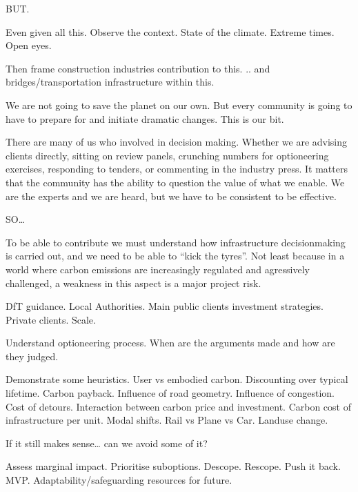 \documentclass[letterpaper,10pt,english]{jupyterBook}
\begin{document}
\sphinxAtStartPar
BUT.

\sphinxAtStartPar
Even given all this. Observe the context.
State of the climate. Extreme times. Open eyes.

\sphinxAtStartPar
Then frame construction industries contribution to this.
.. and bridges/transportation infrastructure within this.

\sphinxAtStartPar
We are not going to save the planet on our own. But every community is going to have to prepare for and initiate dramatic changes. This is our bit.

\sphinxAtStartPar
There are many of us who  involved in decision making. Whether we are advising clients directly, sitting on review panels, crunching numbers for optioneering exercises, responding to tenders, or commenting in the industry press. It matters that the community has the ability to question the value of what we enable. We are the experts and we are heard, but we have to be consistent to be effective.

\sphinxAtStartPar
SO…

\sphinxAtStartPar
To be able to contribute we must understand how infrastructure decision\sphinxhyphen{}making is carried out, and we need to be able to “kick the tyres”. Not least because in a world where carbon emissions are increasingly regulated and agressively challenged, a weakness in this aspect is a major project risk.

\sphinxAtStartPar
DfT guidance. Local Authorities. Main public clients \sphinxhyphen{} investment strategies. Private clients. Scale.

\sphinxAtStartPar
Understand optioneering process. When are the arguments made and how are they judged.

\sphinxAtStartPar
Demonstrate some heuristics.
User vs embodied carbon. Discounting over typical life\sphinxhyphen{}time. Carbon pay\sphinxhyphen{}back.
Influence of road geometry.
Influence of congestion.
Cost of detours.
Interaction between carbon price and investment.
Carbon cost of infrastructure per unit.
Modal shifts. Rail vs Plane vs Car.
Land\sphinxhyphen{}use change.

\sphinxAtStartPar
If it still makes sense… can we avoid some of it?

\sphinxAtStartPar
Assess marginal impact. Prioritise sub\sphinxhyphen{}options.
De\sphinxhyphen{}scope. Re\sphinxhyphen{}scope.
Push it back.
MVP.
Adaptability/safe\sphinxhyphen{}guarding resources for future.
\end{document}
